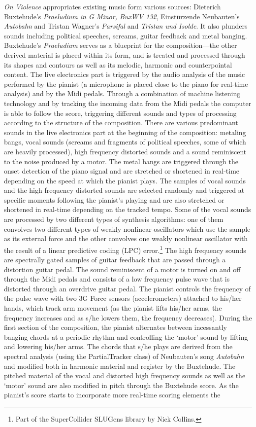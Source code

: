 \emph{On Violence} appropriates existing music form various sources: Dieterich Buxtehude's \emph{Praeludium in G Minor, BuxWV 132}, Einst\"{u}rzende Neubauten's \emph{Autobahn} and  Tristan Wagner's \emph{Parsifal} and \emph{Tristan und Isolde}. It also plunders sounds including political speeches, screams, guitar feedback and metal banging. Buxtehude's \emph{Praeludium} serves as a blueprint for the composition---the other derived material is placed within its form, and is treated and processed through its shapes and contours as well as its melodic, harmonic and counterpointal content. The live electronics part is triggered by the audio analysis of the music performed by the pianist (a microphone is placed close to the piano for real-time analysis) and by the Midi pedals. Through a combination of machine listening technology and by tracking the incoming data from the Midi pedals the computer is able to follow the score, triggering different sounds and types of processing according to the structure of the composition. There are various predominant sounds in the live electronics part at the beginning of the composition: metaling bangs, vocal sounds (screams and fragments of political speeches, some of which are heavily processed), high frequency distorted sounds and a sound reminiscent to the noise produced by a motor. The metal bangs are triggered through the onset detection of the piano signal and are stretched or shortened in real-time depending on the speed at which the pianist plays. The samples of vocal sounds and the high frequency distorted sounds are selected randomly and triggered at specific moments following the pianist's playing and are also stretched or shortened in real-time depending on the tracked tempo. Some of the vocal sounds are processed by two different types of synthesis algorithms: one of them convolves two different types of weakly nonlinear oscillators which use the sample as its external force and the other convolves one weakly nonlinear oscillator with the result of a linear predictive coding (LPC) error.\footnote{Part of the SuperCollider SLUGens library by Nick Collins.} The high frequency sounds are spectrally gated samples of guitar feedback that are passed through a distortion guitar pedal. The sound reminiscent of a motor is turned on and off through the Midi pedals and consists of a low frequency pulse wave that is distorted through an overdrive guitar pedal. The pianist controls the frequency of the pulse wave with two 3G Force sensors (accelerometers) attached to his/her hands, which track arm movement (as the pianist lifts his/her arms, the frequency increases and as s/he lowers them, the frequency decreases). During the first section of the composition, the pianist alternates between incessantly banging chords at a periodic rhythm and controlling the `motor' sound by lifting and lowering his/her arms. The chords that s/he plays are derived from the spectral analysis (using the PartialTracker class) of Neubauten's song \emph{Autobahn} and modified both in harmonic material and register by the Buxtehude. The pitched material of the vocal and distorted high frequency sounds as well as the `motor' sound are also modified in pitch through the Buxtehude score. As the pianist's score starts to incorporate more real-time scoring elements the 